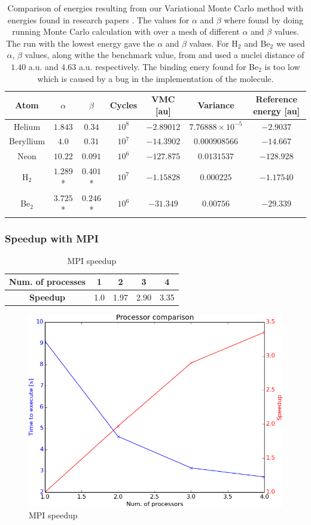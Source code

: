 		\begin{table}
			\center %
			\begin{tabular}{|c|c|c|c|c|c|c|}
				\hline 
				Atom  & $\alpha$ & $\beta$ & Cycles & VMC {[}au{]} & Variance & Reference energy {[}au{]} \tabularnewline
				\hline 
				Helium & $1.843$ & $0.34$ & $10^{8}$ & $-2.89012$ & $7.76888\times10^{-5}$ & $-2.9037$\tabularnewline
				\hline 
				Beryllium  & $4.0$ & $0.31$ & $10^{7}$ & $-14.3902$  & $0.000908566$ & $-14.667$ \tabularnewline
				\hline 
				Neon  & $10.22$ & $0.091$ & $10^{6}$ & $-127.875$ & $0.0131537$ & $-128.928$ \tabularnewline
				\hline 
				H$_2$ & $1.289$* & $0.401$* & $10^7$ & $-1.15828$	& $0.000225$  & $-1.17540$ \tabularnewline
				\hline
				Be$_{2}$ & $3.725$* & $0.246$* & $10^6$ & $ -31.349 $	& $ 0.00756 $  & $-29.339$ \tabularnewline
				\hline
			\end{tabular}\protect\caption{Comparison of energies resulting from our Variational Monte Carlo method with
			energies found in research papers \parencite{Koput_2011_PCCP} \parencite{Binkley_1975}. The values for \(\alpha\) and \( \beta \) where found by doing running Monte Carlo calculation with over a mesh of different \(\alpha\) and \( \beta \) values. The run with the lowest energy gave the \(\alpha\) and \(\beta\) values. For H$_2$ and Be$_2$ we used $\alpha$, $\beta$ values, along withe the benchmark value, from \citet{Ihle_Ledum} and used a nuclei distance of \( 1.40 \) a.u. and \( 4.63\) a.u. respectively. The binding enery found for Be\(_2\) is too low which is caused by a bug in the implementation of the molecule.}
			\label{tab:EnergyAlphaBetaReference} 
		\end{table}


	\subsubsection{Speedup with MPI}
		\begin{table}
			\center
			\begin{tabular}{| c | c| c| c| c|}
				\hline
					\textbf{Num. of processes} &	1	&	2	&	3	&	4
				\\ \hline
				\textbf{Speedup}	&	1.0	&	1.97	&	2.90	&	3.35
				\\	\hline
			\end{tabular}
			\caption{MPI speedup}
			\label{tab:MPI_speedup}
		\end{table}

		\begin{figure}
			\centering \includegraphics[width=0.45\linewidth]{../figures/processor_number_time_comparison}
			\protect\caption{MPI speedup}
			\label{fig:MPI_speedup}
		\end{figure}

